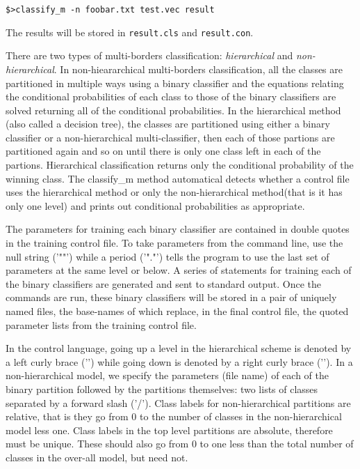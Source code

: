 \documentclass[12pt]{article}
\begin{document}
\begin{list}
\begin{verbatim}
$>classify_m -n foobar.txt test.vec result
\end{verbatim}

The results will be stored in \verb"result.cls" and \verb"result.con".

  There are two types of multi-borders classification: {\it hierarchical} and {\it non-hierarchical}.  In non-hieararchical multi-borders classification, all the classes are partitioned in multiple ways using a binary classifier and the equations relating the conditional probabilities of each class to those of the binary classifiers are solved returning all of the conditional probabilities.  In the hierarchical method (also called a decision tree), the classes are partitioned using either a binary classifier or a non-hierarchical multi-classifier, then each of those partions are partitioned again and so on until there is only one class left in each of the partions.  Hierarchical classification returns only the conditional probability of the winning class.  The classify_m method automatical detects whether a control file uses the hierarchical method or only the non-hierarchical method(that is it has only one level) and prints out conditional probabilities as appropriate.  

  The parameters for training each binary classifier are contained in double quotes in the training control file.  To take parameters from the command line, use the null string ('""') while a period ('"."') tells the program to use the last set of parameters at the same level or below.  A series of statements for training each of the binary classifiers are generated and sent to standard output.  Once the commands are run, these binary classifiers will be stored in a pair of uniquely named files, the base-names of which replace, in the final control file, the quoted parameter lists from the training control file.

  In the control language, going up a level in the hierarchical scheme is denoted by a left curly brace ('{') while going down is denoted by a right curly brace ('}').  In a non-hierarchical model, we specify the parameters (file name) of each of the binary partition followed by the partitions themselves: two lists of classes separated by a forward slash ('/').  Class labels for non-hierarchical partitions are relative, that is they go from 0 to the number of classes in the non-hierarchical model less one.  Class labels in the top level partitions are absolute, therefore must be unique.  These should also go from 0 to one less than the total number of classes in the over-all model, but need not.


\end{list}
\end{document}
